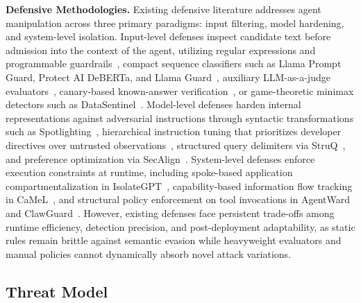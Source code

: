 \noindent
\textbf{Defensive Methodologies.} Existing defensive literature
addresses agent manipulation across three primary paradigms: input
filtering, model hardening, and system-level isolation. Input-level
defenses inspect candidate text before admission into the context of
the agent, utilizing regular expressions and programmable
guardrails~\cite{nemoguardrails}, compact sequence classifiers such as
Llama Prompt Guard, Protect AI DeBERTa, and Llama
Guard~\cite{promptguard,protectaideberta,llamaguard}, auxiliary
LLM-as-a-judge evaluators~\cite{zheng-judge}, canary-based
known-answer verification~\cite{liu-injection}, or game-theoretic
minimax detectors such as
DataSentinel~\cite{datasentinel}. Model-level defenses harden internal
representations against adversarial instructions through syntactic
transformations such as Spotlighting~\cite{spotlighting}, hierarchical
instruction tuning that prioritizes developer directives over
untrusted observations~\cite{instructionhierarchy}, structured query
delimiters via StruQ~\cite{struq}, and preference optimization via
SecAlign~\cite{secalign}. System-level defenses enforce execution
constraints at runtime, including spoke-based application
compartmentalization in IsolateGPT~\cite{isolategpt}, capability-based
information flow tracking in CaMeL~\cite{camel}, and structural policy
enforcement on tool invocations in AgentWard and
ClawGuard~\cite{agentward,clawguard}. However, existing defenses face
persistent trade-offs among runtime efficiency, detection precision,
and post-deployment adaptability, as static rules remain brittle
against semantic evasion while heavyweight evaluators and manual
policies cannot dynamically absorb novel attack variations.


\subsection{Threat Model}
\label{sec:threat-model}

